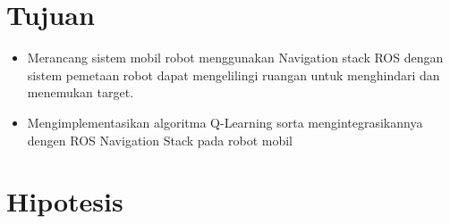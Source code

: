 \section{Tujuan}
\begin{itemize}
	\item Merancang sistem  mobil robot menggunakan Navigation stack ROS dengan sistem pemetaan robot dapat mengelilingi ruangan untuk menghindari dan menemukan target.
	\item Mengimplementasikan algoritma Q-Learning sorta mengintegrasikannya dengen ROS Navigation Stack pada robot mobil
\end{itemize}


\section{Hipotesis}
   
